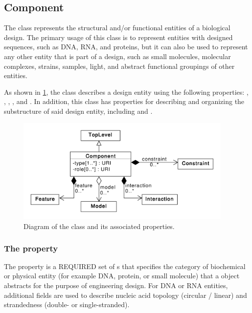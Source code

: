 \subsection{Component}
\label{sec:Component}

The  class represents the structural and/or functional entities of a biological design. The primary usage of this class is to represent entities with designed sequences, such as DNA, RNA, and proteins, but it can also be used to represent any other entity that is part of a design, such as small molecules, molecular complexes, strains, samples, light, and abstract functional groupings of other entities.

As shown in \ref{uml:component}, the  class describes a design entity using the following properties: , , , , and . 
In addition, this class has properties for describing and organizing the substructure of said design entity, including  and .

\begin{figure}[ht]
\begin{center}
\includegraphics[width=0.95\textwidth]{uml/component}
\caption[]{Diagram of the  class and its associated properties.}
\label{uml:component}
\end{center}
\end{figure} 

\subsubsection*{The  property}
\label{sec:types:CD}

The  property is a REQUIRED set of s that
specifies the category of biochemical or physical entity (for example DNA,
protein, or small molecule) that a  object abstracts
for the purpose of engineering design. For DNA or RNA entities,
additional  fields are used to describe nucleic acid
topology (circular / linear) and strandedness (double- or single-stranded).

